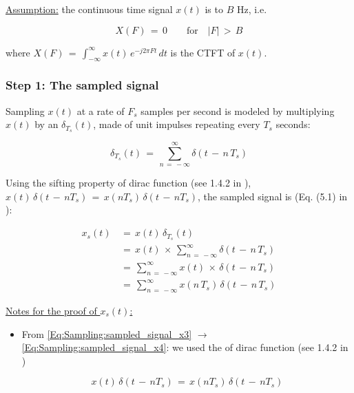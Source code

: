 \underline{Assumption:} the continuous time signal $x(t)$ is  to $B$ Hz, i.e.

\begin{equation}
X(F) \, = \, 0 \qquad \text{for} \quad |F| \, > \, B
\label{Eq:Sampling:bandlimited}
\end{equation}

where $X(F) \, = \, \displaystyle\int_{-\infty}^{\infty} x(t) \, e^{-j 2 \pi F t} \, dt$ is the CTFT of $x(t)$.

\subsubsection*{Step 1: The sampled signal}

Sampling $x(t)$ at a rate of $F_s$ samples per second is modeled by multiplying $x(t)$ by an  $\delta_{T_s}(t)$, made of unit impulses repeating every $T_s$ seconds:

\begin{equation}
\delta_{T_s}(t) \, = \, \sum_{n \, = \, -\infty}^{\infty} \delta(t \, - \, n \, T_s)
\label{Eq:Sampling:impulse_train}
\end{equation}

Using the sifting property of dirac function (see 1.4.2 in \cite{signal_processing_Lathi}), $x(t) \, \delta(t \, - \, n T_s) \, = \, x(n T_s) \, \delta(t \, - \, n T_s)$, the sampled signal is (Eq. (5.1) in \cite{signal_processing_Lathi}):


\begin{align}
x_s(t) \, &= \, x(t) \, \delta_{T_s}(t) \\ 
		 &= \, x(t) \, \times \, \displaystyle\sum_{n \, = \, -\infty}^{\infty} \delta(t \, - \, n \, T_s) \label{Eq:Sampling:sampled_signal_x2} \\ 
		 &= \,\displaystyle\sum_{n \, = \, -\infty}^{\infty} x(t)\,  \times \, \delta(t \, - \, n \, T_s) \label{Eq:Sampling:sampled_signal_x3} \\ 
		&= \, \displaystyle\sum_{n \, = \, -\infty}^{\infty} x(n \,T_s) \, \delta(t \, - \, n \, T_s) \label{Eq:Sampling:sampled_signal_x4} 
\end{align}
\label{Eq:Sampling:sampled_signal}

\underline{Notes for the proof of $x_s(t)$:}

\begin{itemize}

\item From \autoref{Eq:Sampling:sampled_signal_x3} $\rightarrow$ \autoref{Eq:Sampling:sampled_signal_x4}: we used the  of dirac function (see 1.4.2 in \cite{signal_processing_Lathi})

\begin{equation}
x(t) \, \delta(t \, - \, n T_s) \, = \, x(n T_s) \, \delta(t \, - \, n T_s)
\end{equation}

\end{itemize}



